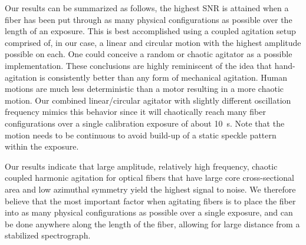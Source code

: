 \documentclass[twocolumn]{emulateapj}
\begin{document}

Our results can be summarized as follows, the highest SNR is attained when a fiber has been put through as many physical configurations as possible over the length of an exposure. This is best accomplished using a coupled agitation setup comprised of, in our case, a linear and circular motion with the highest amplitude possible on each. One could conceive a random or chaotic agitator as a possible implementation. These conclusions are highly reminiscent of the idea that hand-agitation is consistently better than any form of mechanical agitation. Human motions are much less deterministic than a motor resulting in a more chaotic motion. Our combined linear/circular agitator with slightly different oscillation frequency mimics this behavior since it will chaotically reach many fiber configurations over a single calibration exposure of about \SI{10}{\second}. Note that the motion needs to be continuous to avoid build-up of a static speckle pattern within the exposure.

Our results indicate that large amplitude, relatively high frequency, chaotic coupled harmonic agitation for optical fibers that have large core cross-sectional area and low azimuthal symmetry yield the highest signal to noise. We therefore believe that the most important factor when agitating fibers is to place the fiber into as many physical configurations as possible over a single exposure, and can be done anywhere along the length of the fiber, allowing for large distance from a stabilized spectrograph.

\end{document}
